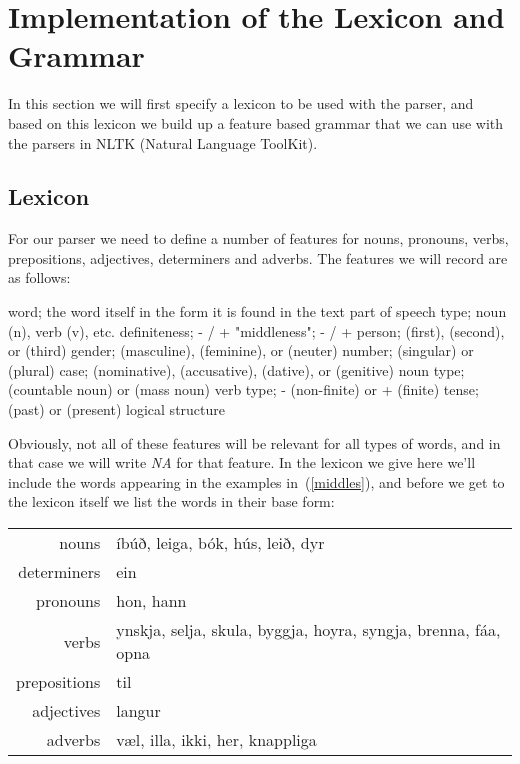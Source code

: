 \documentclass[12pt,%
]{lin-v2/lin}
\let\Oldsubsection\subsection
\renewcommand{\subsection}{\FloatBarrier\Oldsubsection}
\newcommand{\pref}[1]{(\ref{#1})}
\begin{document}
\section{Implementation of the Lexicon and Grammar}

In this section we will first specify a lexicon to be used with the parser,
and based on this lexicon we build up a feature based grammar that we can use
with the parsers in NLTK (Natural Language ToolKit).

\subsection{Lexicon}

For our parser we need to define a number of features for nouns, pronouns, verbs,
prepositions, adjectives, determiners and adverbs. The features we will record are as follows:
\begin{exe}
    \ex\label{features}
    \begin{xlist}
    \ex word; the word itself in the form it is found in the text
    \ex part of speech type; noun (n), verb (v), etc.
    \ex definiteness; \Def-{} / \Def+{}
    \ex "middleness"; \Mid-{} / \Mid+{}
    \ex person; \First{} (first), \Second{} (second), or \Third{} (third)
    \ex gender; \M{} (masculine), \F{} (feminine), or \N{} (neuter) 
    \ex number; \Sg{} (singular) or \Pl{} (plural)
    \ex case; \Nom{} (nominative), \Acc{} (accusative), \Dat{} (dative), or \Gen{} (genitive)
    \ex noun type; \Count{} (countable noun) or \Mass{} (mass noun)
    \ex verb type; \Fin-{} (non-finite) or \Fin+{} (finite)
    \ex tense; \Pst{} (past) or \Prs{} (present) 
    \ex logical structure
    \end{xlist}
\end{exe}

Obviously, not all of these features will be relevant for all types of words, and in that case
we will write \emph{NA} for that feature. In the lexicon we give here we'll include
the words appearing in the examples in~\pref{middles}, and before we get to the lexicon itself
we list the words in their base form:
\begin{table}[!htbp]
    \begin{tabular}{rl}
        {nouns} & íbúð, leiga, bók, hús, leið, dyr \\
        {determiners} & ein \\
        {pronouns} & hon, hann \\
        {verbs} & ynskja, selja, skula, byggja, hoyra, syngja, brenna, fáa, opna \\
        {prepositions} & til \\
        {adjectives} & langur \\
        {adverbs} & væl, illa, ikki, her, knappliga \\
    \end{tabular}
\end{table}
\end{document}
